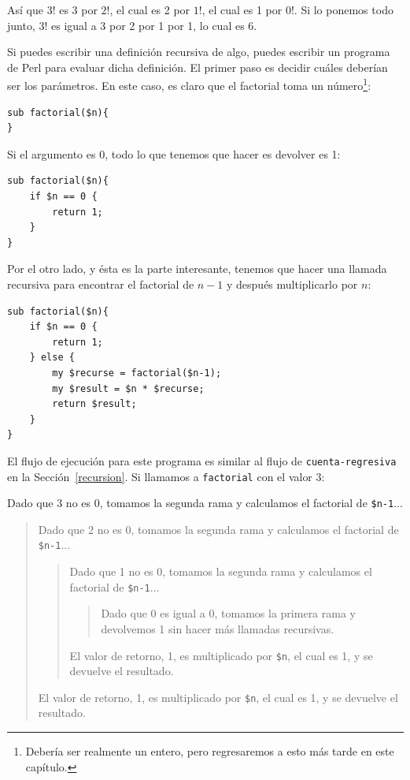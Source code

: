 Así que $3!$ es 3 por $2!$, el cual es 2 por $1!$, el cual es 1 por
$0!$. Si lo ponemos todo junto, $3!$ es igual a 3 por 2 por 1 por 1, 
lo cual es 6.

Si puedes escribir una definición recursiva de algo, puedes escribir
un programa de Perl para evaluar dicha definición. El primer paso
es decidir cuáles deberían ser los parámetros. En este caso, es
claro que el factorial toma un número\footnote{Debería ser realmente un entero, pero regresaremos a esto más tarde en este capítulo.}:

\begin{verbatim}
sub factorial($n){
}
\end{verbatim}
%
Si el argumento es 0, todo lo que tenemos que hacer es devolver es 1:

\begin{verbatim}
sub factorial($n){
    if $n == 0 {
        return 1;
    }
}   
\end{verbatim}
%
Por el otro lado, y ésta es la parte interesante, tenemos que hacer
una llamada recursiva para encontrar el factorial de $n-1$ y después
multiplicarlo por $n$:

\begin{verbatim}
sub factorial($n){
    if $n == 0 {
        return 1;
    } else {
        my $recurse = factorial($n-1);
        my $result = $n * $recurse;
        return $result;
    }
}
\end{verbatim}
%
El flujo de ejecución para este programa es similar al flujo de 
{\tt cuenta-regresiva} en la Sección~\ref{recursion}. Si llamamos
a {\tt factorial} con el valor 3:

Dado que 3 no es 0, tomamos la segunda rama y calculamos el factorial de
{\tt \$n-1}...

\begin{quote}
Dado que 2 no es 0, tomamos la segunda rama y calculamos el factorial de
{\tt \$n-1}...


  \begin{quote}
  Dado que 1 no es 0, tomamos la segunda rama y calculamos el factorial de
  {\tt \$n-1}...


    \begin{quote}
    Dado que 0 es igual a 0, tomamos la primera rama y devolvemos 1
    sin hacer más llamadas recursivas.
    \end{quote}

	
  El valor de retorno, 1, es multiplicado por \verb|$n|, el cual es 1,
  y se devuelve el resultado.
  \end{quote}


El valor de retorno, 1, es multiplicado por \verb|$n|, el cual es 1,
y se devuelve el resultado.
\end{quote}



